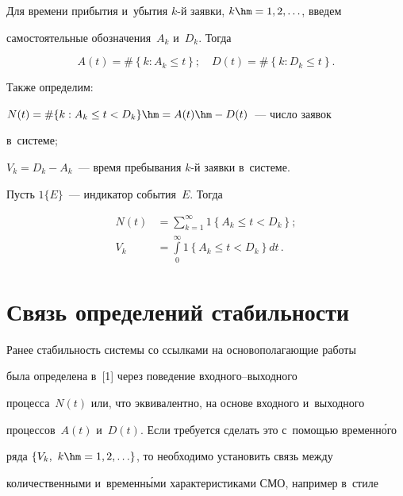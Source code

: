      


     Для времени прибытия и~убытия $k$-й заявки, $k\hm=1,2,\ldots$, введем 


самостоятельные обозначения~$A_k$ и~$D_k$. Тогда 


     $$ 


     A(t)=\# \left\{ k: A_k\leq t\right\};\quad D(t)=\# \left\{ k: D_k\leq t\right\}.


     $$




     Также определим:


         $N(t)= \# \{ k: A_k\leq t< D_k\}\hm= A(t)\hm-D(t)$~---  чис\-ло заявок  


в~сис\-те\-ме;


          $V_k=D_k-A_k$~--- время пребывания $k$-й заявки в~сис\-теме.


     


     Пусть $1\{E\}$~--- индикатор события~$E$. Тогда


     \begin{align*}


     N(t) &=\displaystyle \sum\limits^\infty_{k=1} 1 \left\{ A_k\leq t < D_k\right\};\\


     V_k&= \int\limits_0^\infty 1\left\{ A_k\leq t<D_k\right\}dt\,.


     \end{align*}





\section{Связь определений стабильности}





     Ранее стабильность системы со ссылками на основополагающие работы 


была определена в~[1] через поведение вход\-но\-го--вы\-ход\-но\-го 


процесса~$N(t)$ или, что эквивалентно, на основе входного и~выходного 


процессов~$A(t)$ и~$D(t)$. Если требуется сделать это с~по\-мощью временн\'{о}го 


ряда $\{ V_k,\ k\hm=1,2,\ldots\}$, то необходимо установить связь между 


количественными и~временн\'{ы}ми характеристиками СМО, например в~стиле 


